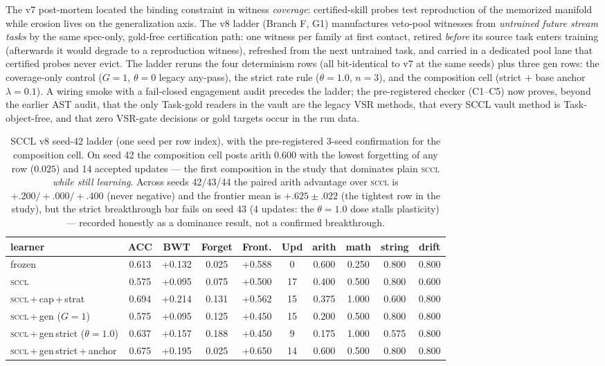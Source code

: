 \documentclass[10pt,conference]{IEEEtran}
\begin{document}
The v7 post-mortem located the binding constraint in witness \emph{coverage}: certified-skill probes test reproduction of the memorized manifold while erosion lives on the generalization axis. The v8 ladder (Branch F, G1) manufactures veto-pool witnesses from \emph{untrained future stream tasks} by the same spec-only, gold-free certification path: one witness per family at first contact, retired \emph{before} its source task enters training (afterwards it would degrade to a reproduction witness), refreshed from the next untrained task, and carried in a dedicated pool lane that certified probes never evict. The ladder reruns the four determinism rows (all bit-identical to v7 at the same seeds) plus three gen rows: the coverage-only control ($G{=}1$, $\theta{=}0$ legacy any-pass), the strict rate rule ($\theta{=}1.0$, $n{=}3$), and the composition cell (strict $+$ base anchor $\lambda{=}0.1$). A wiring smoke with a fail-closed engagement audit precedes the ladder; the pre-registered checker (C1--C5) now proves, beyond the earlier AST audit, that the only Task-gold readers in the vault are the legacy VSR methods, that every SCCL vault method is Task-object-free, and that zero VSR-gate decisions or gold targets occur in the run data.

\begin{table}[t]
\centering
\small
\caption{SCCL v8 seed-42 ladder (one seed per row index), with the pre-registered 3-seed confirmation for the composition cell. On seed 42 the composition cell posts arith $0.600$ with the lowest forgetting of any row ($0.025$) and 14 accepted updates --- the first composition in the study that dominates plain \textsc{sccl} \emph{while still learning}. Across seeds 42/43/44 the paired arith advantage over \textsc{sccl} is $+.200/+.000/+.400$ (never negative) and the frontier mean is $+.625\pm.022$ (the tightest row in the study), but the strict breakthrough bar fails on seed 43 (4 updates: the $\theta{=}1.0$ dose stalls plasticity) --- recorded honestly as a dominance result, not a confirmed breakthrough.}
\label{tab:v8}
\begin{tabular}{lccccccccc}
\toprule
learner & ACC & BWT & Forget & Front. & Upd & arith & math & string & drift \\
\midrule
frozen                     & 0.613 & +0.132 & 0.025 & +0.588 & 0  & 0.600 & 0.250 & 0.800 & 0.800 \\
\textsc{sccl}              & 0.575 & +0.095 & 0.075 & +0.500 & 17 & 0.400 & 0.500 & 0.800 & 0.600 \\
\textsc{sccl}\,+\,cap\,+\,strat            & 0.694 & +0.214 & 0.131 & +0.562 & 15 & 0.375 & 1.000 & 0.600 & 0.800 \\
\textsc{sccl}\,+\,gen ($G{=}1$)            & 0.575 & +0.095 & 0.125 & +0.450 & 15 & 0.200 & 0.500 & 0.800 & 0.800 \\
\textsc{sccl}\,+\,gen\,strict ($\theta{=}1.0$) & 0.637 & +0.157 & 0.188 & +0.450 & 9 & 0.175 & 1.000 & 0.575 & 0.800 \\
\textsc{sccl}\,+\,gen\,strict\,+\,anchor   & 0.675 & +0.195 & 0.025 & +0.650 & 14 & 0.600 & 0.500 & 0.800 & 0.800 \\
\bottomrule
\end{tabular}
\end{table}
\end{document}
